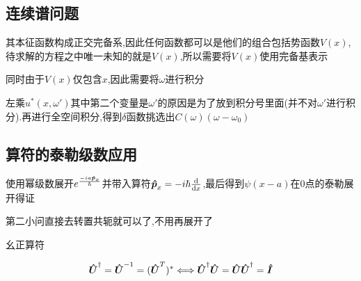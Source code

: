 \documentclass{article}
\begin{document}
        \subsection{连续谱问题}
            其本征函数构成正交完备系,因此任何函数都可以是他们的组合包括势函数$V(x)$,待求解的方程之中唯一未知的就是$V(x)$,所以需要将$V(x)$使用完备基表示
            
            同时由于$V(x)$仅包含$x$,因此需要将$\omega$进行积分

            左乘$u^{*}(x,\omega')$其中第二个变量是$\omega'$的原因是为了放到积分号里面(并不对$\omega'$进行积分).再进行全空间积分,得到$\delta$函数挑选出$C(\omega)(\omega-\omega_{0})$

        \subsection{算符的泰勒级数应用}
            使用幂级数展开$e^{\frac{-ia\vu*{p}_{x}}{\hbar}}$并带入算符$\vu*{p}_{x} = - i \hbar \dv{x}$,最后得到$\psi(x-a)$在$0$点的泰勒展开得证

            第二小问直接去转置共轭就可以了,不用再展开了
            \begin{formal}
                幺正算符

                $$  \vu*{U}^{\dagger} = \vu*{U}^{-1} = (\vu*{U}^{T})^{*} \Longleftrightarrow \vu*{U}^{\dagger} \vu*{U} = \vu*{U} \vu*{U}^{\dagger}  = \vu*{I} $$
            \end{formal}
\end{document}
